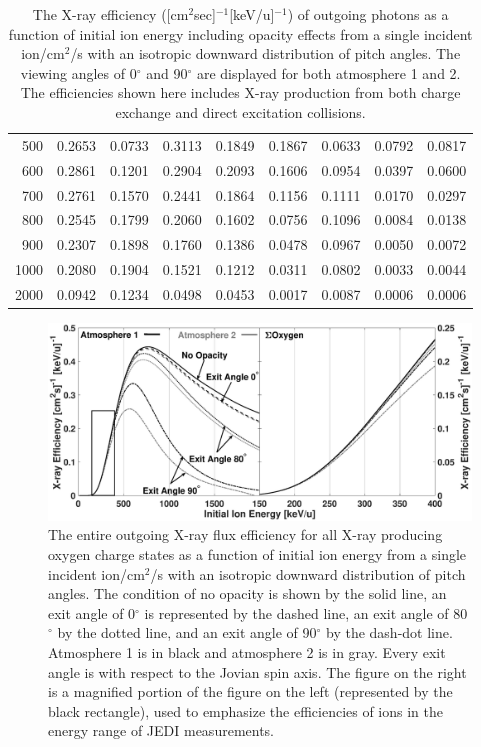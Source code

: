 \documentclass[draft]{agujournal2018}
\begin{document}
\begin{table}
\begin{tabular}{r|c|c|c|c|c|c|c|c}
    500      & 0.2653 & 0.0733 & 0.3113	& 0.1849 & 0.1867 & 0.0633 & 0.0792 & 0.0817 \\
    600      & 0.2861 & 0.1201 & 0.2904	& 0.2093 & 0.1606 & 0.0954 & 0.0397 & 0.0600 \\
    700      & 0.2761 & 0.1570 & 0.2441	& 0.1864 & 0.1156 & 0.1111 & 0.0170 & 0.0297 \\
    800      & 0.2545 & 0.1799 & 0.2060	& 0.1602 & 0.0756 & 0.1096 & 0.0084 & 0.0138 \\
    900      & 0.2307 & 0.1898 & 0.1760	& 0.1386 & 0.0478 & 0.0967 & 0.0050 & 0.0072 \\
    1000     & 0.2080 & 0.1904 & 0.1521	& 0.1212 & 0.0311 & 0.0802 & 0.0033 & 0.0044 \\
    2000     & 0.0942 & 0.1234 & 0.0498	& 0.0453 & 0.0017 & 0.0087 & 0.0006 & 0.0006 \\
    \hline
    \end{tabular}
    \caption{The X-ray efficiency ([cm$^2$sec]$^{-1}$[keV/u]$^{-1}$) of outgoing photons as a function of initial ion energy including opacity effects from a single incident ion/cm$^2$/s with an isotropic downward distribution of pitch angles. The viewing angles of 0$^\circ$ and 90$^\circ$ are displayed for both atmosphere 1 and 2. The efficiencies shown here includes X-ray production from both charge exchange and direct excitation collisions.}
    \label{tab:XrayEff}
\end{table}

\begin{figure}
    \centering
    \includegraphics[width=\textwidth]{Figures/OxyXrayEff2.eps}
    \caption{The entire outgoing X-ray flux efficiency for all X-ray producing oxygen charge states as a function of initial ion energy from a single incident ion/cm$^2$/s with an isotropic downward distribution of pitch angles. The condition of no opacity is shown by the solid line, an exit angle of 0$^{\circ}$ is represented by the dashed line, an exit angle of 80$^{\circ}$ by the dotted line, and an exit angle of 90$^{\circ}$ by the dash-dot line. Atmosphere 1 is in black and atmosphere 2 is in gray. Every exit angle is with respect to the Jovian spin axis. The figure on the right is a magnified portion of the figure on the left (represented by the black rectangle), used to emphasize the efficiencies of ions in the energy range of JEDI measurements.}
    \label{fig:OxyXrayEff}
\end{figure}
\end{document}
